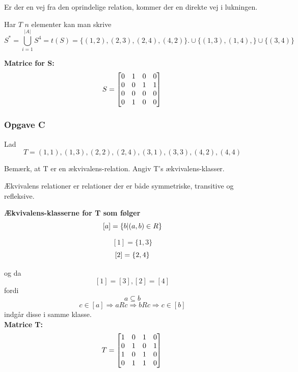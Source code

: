 \documentclass{article}
\begin{document}
Er der en vej fra den oprindelige relation, kommer der en direkte vej i lukningen.

Har $T$ $n$ elementer kan man skrive \[S^*=\bigcup_{i=1}^{|A|} S^4 = t(S)= \{(1, 2),(2, 3),(2, 4),(4, 2)\}. \cup \{(1,3), (1,4),\} \cup \{(3,4)\}\]



\textbf{Matrice for S:}\\

\[S=\begin{bmatrix}
0 & 1 & 0 & 0\\
0 & 0 & 1 & 1\\
0 & 0 & 0 & 0\\
0 & 1 & 0 & 0
\end{bmatrix}\\\]



\subsubsection{Opgave C}

Lad \[T = {(1, 1),(1, 3),(2, 2),(2, 4),(3, 1),(3, 3),(4, 2),(4, 4)}\]

Bemærk, at T er en ækvivalens-relation.
Angiv T's ækvivalens-klasser.

Ækvivalens relationer er relationer der er både symmetriske, transitive og refleksive. 

\textbf{Ækvivalens-klasserne for T som følger \[[a] = \{b \vert (a,b) \in R\}\\\]}



\[[1]=\{1,3\}\]
\[[2]=\{2,4\}\\\]

og da \[[1]=[3], [2]=[4]\] fordi \[a\subseteq b\] \[c \in [a] \Rightarrow aRc \Rightarrow bRc \Rightarrow c\in [b]\]
indgår disse i samme klasse.\\

\textbf{Matrice T:}\\

\[T=\begin{bmatrix}
1 & 0 & 1 & 0\\
0 & 1 & 0 & 1\\
1 & 0 & 1 & 0\\
0 & 1 & 1 & 0
\end{bmatrix}\\\]
\end{document}
